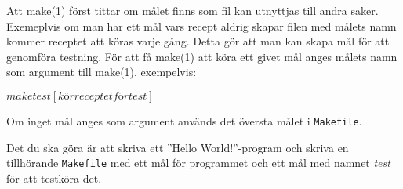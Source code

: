 \documentclass[a4paper]{miunasgn}
\begin{document}
Att make(1) först tittar om målet finns som fil kan utnyttjas till andra saker.
Exemeplvis om man har ett mål vars recept aldrig skapar filen med målets namn 
kommer receptet att köras varje gång.
Detta gör att man kan skapa mål för att genomföra testning.
För att få make(1) att köra ett givet mål anges målets namn som argument till 
make(1), exempelvis:
\begin{terminal}
$ make test
[kör receptet för test]
$
\end{terminal}
Om inget mål anges som argument används det översta målet i \texttt{Makefile}.

Det du ska göra är att skriva ett ''Hello World!''-program och skriva en 
tillhörande \texttt{Makefile} med ett mål för programmet och ett mål med namnet 
\emph{test} för att testköra det.






\end{document}
